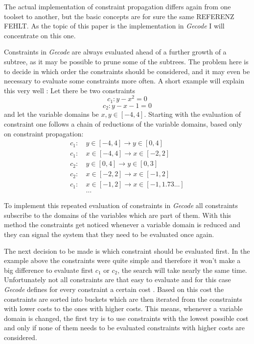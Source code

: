 \documentclass[10pt,
               a4paper,
               journal,
               ]{IEEEtran}
\begin{document}
	The actual implementation of constraint propagation differs again from one toolset to another, but the basic concepts are for sure the same REFERENZ FEHLT. As the topic of this paper is the implementation in \emph{Gecode} I will concentrate on this one.
	
	Constraints in \emph{Gecode} are always evaluated ahead of a further growth of a subtree, as it may be possible to prune some of the subtrees. The problem here is to decide in which order the constraints should be considered, and it may even be necessary to evaluate some constraints more often. A short example will explain this very well \cite[p.~575]{handbookCP}: Let there be two constraints 
	\begin{equation}
		c_1: y - x^2 = 0
	\end{equation}
	\begin{equation}
		c_2: y - x - 1 = 0
	\end{equation}
	and let the variable domains be $x, y \in [-4, 4]$. Starting with the evaluation of constraint one follows a chain of reductions of the variable domains, based only on constraint propagation:
	\begin{equation}
	\begin{split}
		c_1:\ &y \in [-4, 4] \rightarrow y \in [0, 4] \\
		c_1:\ &x \in [-4, 4] \rightarrow x \in [-2, 2] \\
		c_2:\ &y \in [0, 4] \rightarrow y \in [0, 3] \\
		c_2:\ &x \in [-2, 2] \rightarrow x \in [-1, 2] \\
		c_1:\ &x \in [-1, 2] \rightarrow x \in [-1, 1.73 \dots] \\
		&\dots
	\end{split}
	\end{equation}
	
	To implement this repeated evaluation of constraints in \emph{Gecode} all constraints subscribe to the domains of the variables which are part of them. With this method the constraints get noticed whenever a variable domain is reduced and they can signal the system that they need to be evaluated once again.
	
	The next decision to be made is which constraint should be evaluated first. In the example above the constraints were quite simple and therefore it won't make a big difference to evaluate first $c_1$ or $c_2$, the search will take nearly the same time. Unfortunately not all constraints are that easy to evaluate and for this case \emph{Gecode} defines for every constraint a certain cost \cite[p.~275]{programmingGecode}. Based on this cost the constraints are sorted into buckets which are then iterated from the constraints with lower costs to the ones with higher costs. This means, whenever a variable domain is changed, the first try is to use constraints with the lowest possible cost and only if none of them needs to be evaluated constraints with higher costs are considered.
	
\end{document}

